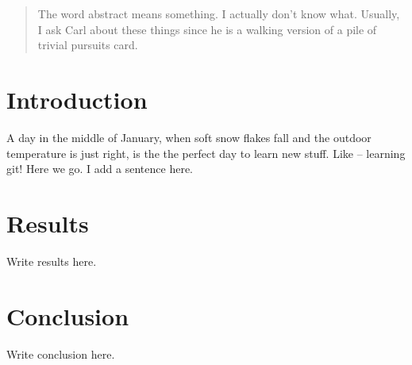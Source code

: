 \documentclass{article}
\begin{document}
\begin{abstract}
The word abstract means something. I actually don't know what.
Usually, I ask Carl about these things since he is a walking version
of a pile of trivial pursuits card.

\end{abstract}

\section{Introduction}

A day in the middle of January, when soft snow flakes fall and the outdoor temperature is just right, is the the perfect day to learn new stuff. 
Like -- learning git! Here we go. I add a sentence here. 

\section{Results}

Write results here.

\section{Conclusion}

Write conclusion here.
\end{document}
